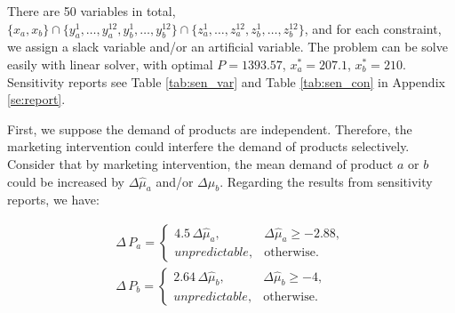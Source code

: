 \documentclass[a4paper,11pt]{article}
\begin{document}
\begin{table}[ht]
\caption{Demand Realisations: Statistical Summary}
\label{tab:summary}
\centering
{}
\end{table}

There are 50 variables in total, $\big\{ x_a,x_b \big\} \cap \big\{ y_a^1,\dots,y_a^{12},y_b^1,\dots,y_b^{12} \big\} \cap \big\{ z_a^1,\dots,z_a^{12},z_b^1,\dots,z_b^{12} \big\}$, and for each constraint, we assign a slack variable and/or an artificial variable. The problem can be solve easily with linear solver, with optimal $P=1393.57$, $x_a^*=207.1$, $x_b^*=210$. Sensitivity reports see Table \ref{tab:sen_var} and Table \ref{tab:sen_con} in Appendix \ref{se:report}.

First, we suppose the demand of products are independent. Therefore, the marketing intervention could interfere the demand of products selectively. Consider that by marketing intervention, the mean demand of product $a$ or $b$ could be increased by $\Delta \hat{\mu}_a$ and/or $\Delta \hat{\mu}_b$. Regarding the results from sensitivity reports, we have:

\[
\begin{aligned}
    \Delta \, P_a = 
    \begin{cases}
        4.5 \, \Delta \hat{\mu}_a, & \Delta \hat{\mu}_a \geq -2.88,\\
        unpredictable, & \text{otherwise}.
    \end{cases}\\
    \Delta \, P_b = 
    \begin{cases}
        2.64 \, \Delta \hat{\mu}_b, & \Delta \hat{\mu}_b \geq -4,\\
        unpredictable, & \text{otherwise}.
    \end{cases}
\end{aligned}
\]
\end{document}
